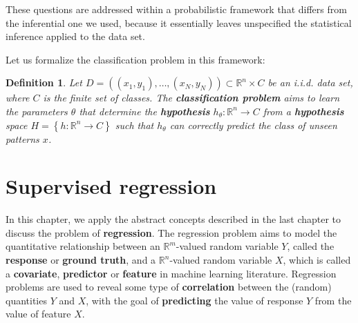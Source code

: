 \documentclass{report}
\newtheorem{definition}{Definition}[chapter]
\begin{document}
These questions are addressed within a probabilistic framework that differs from the inferential one we used, because it essentially leaves unspecified the statistical inference applied to the data set.

Let us formalize the classification problem in this framework:

\begin{definition}
Let $D = ((x_1,y_1),\dots,(x_N,y_N)) \subset \mathbb{R}^n\times C$ be an i.i.d. data set, where $C$ is the finite set of classes. The \textbf{classification problem} aims to learn the parameters $\theta$ that determine the \textbf{hypothesis} $h_\theta : \mathbb{R}^n \to C$ from a \textbf{hypothesis} space $H = \left\{h : \mathbb{R}^n \to C\right\}$ such that $h_\theta$ can correctly predict the class of unseen patterns $x$.
\end{definition}



\chapter{Supervised regression}
In this chapter, we apply the abstract concepts described in the last chapter to discuss the problem of \textbf{regression}. The regression problem aims to model the quantitative relationship between an $\mathbb{R}^m$-valued random variable $Y$, called the \textbf{response} or \textbf{ground truth}, and a $\mathbb{R}^n$-valued random variable $X$, which is called a \textbf{covariate}, \textbf{predictor} or \textbf{feature} in machine learning literature. Regression problems are used to reveal some type of \textbf{correlation} between the (random) quantities $Y$ and $X$, with the goal of \textbf{predicting} the value of response $Y$ from the value of feature $X$.
\end{document}
